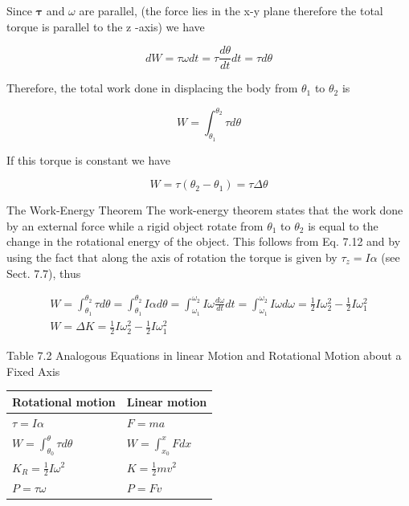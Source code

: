 \documentclass[10pt]{article}
\begin{document}
Since $\boldsymbol{\tau}$ and $\omega$ are parallel, (the force lies in the x-y plane therefore the total torque is parallel to the z -axis) we have

$$
d W=\tau \omega d t=\tau \frac{d \theta}{d t} d t=\tau d \theta
$$

Therefore, the total work done in displacing the body from $\theta_{1}$ to $\theta_{2}$ is


\begin{equation*}
W=\int_{\theta_{1}}^{\theta_{2}} \tau d \theta \tag{7.12}
\end{equation*}


If this torque is constant we have

$$
W=\tau\left(\theta_{2}-\theta_{1}\right)=\tau \Delta \theta
$$

The Work-Energy Theorem The work-energy theorem states that the work done by an external force while a rigid object rotate from $\theta_{1}$ to $\theta_{2}$ is equal to the change in the rotational energy of the object. This follows from Eq. 7.12 and by using the fact that along the axis of rotation the torque is given by $\tau_{z}=I \alpha$ (see Sect. 7.7), thus

$$
\begin{gathered}
W=\int_{\theta_{1}}^{\theta_{2}} \tau d \theta=\int_{\theta_{1}}^{\theta_{2}} I \alpha d \theta=\int_{\omega_{1}}^{\omega_{2}} I \omega \frac{d \omega}{d t} d t=\int_{\omega_{1}}^{\omega_{2}} I \omega d \omega=\frac{1}{2} I \omega_{2}^{2}-\frac{1}{2} I \omega_{1}^{2} \\
W=\Delta K=\frac{1}{2} I \omega_{2}^{2}-\frac{1}{2} I \omega_{1}^{2}
\end{gathered}
$$

Table 7.2 Analogous Equations in linear Motion and Rotational Motion about a Fixed Axis

\begin{center}
\begin{tabular}{l|l}
\hline
Rotational motion & Linear motion \\
\hline
$\tau=I \alpha$ & $F=m a$ \\
\hline
$W=\int_{\theta_{0}}^{\theta} \tau d \theta$ & $W=\int_{x_{0}}^{x} F d x$ \\
\hline
$K_{R}=\frac{1}{2} I \omega^{2}$ & $K=\frac{1}{2} m v^{2}$ \\
\hline
$P=\tau \omega$ & $P=F v$ \\
\hline
\end{tabular}
\end{center}
\end{document}
